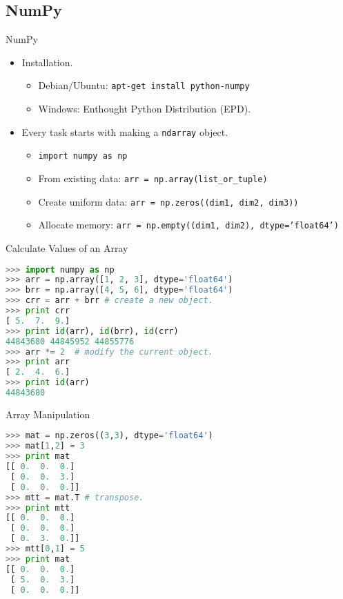 \documentclass[dvips,xcolor=pst]{beamer}
\begin{document}
\subsection{
NumPy
}

\begin{frame}{
%
NumPy
%
}
\begin{itemize} \large
  \item Installation.
  \begin{itemize} \large
    \item Debian/Ubuntu: \texttt{apt-get install python-numpy}
    \item Windows: Enthought Python Distribution (EPD).
  \end{itemize}
  \item Every task starts with making a \texttt{ndarray} object.
  \begin{itemize} \large
    \item \texttt{import numpy as np}
    \item From existing data: \texttt{arr = np.array(list\_or\_tuple)}
    \item Create uniform data: \texttt{arr = np.zeros((dim1, dim2, dim3))}
    \item Allocate memory: \texttt{arr = np.empty((dim1, dim2), dtype='float64')}
  \end{itemize}
\end{itemize}
\end{frame}

\begin{frame}[fragile]{
%
Calculate Values of an Array
%
}
\begin{lstlisting}[language=Python]
>>> import numpy as np
>>> arr = np.array([1, 2, 3], dtype='float64')
>>> brr = np.array([4, 5, 6], dtype='float64')
>>> crr = arr + brr # create a new object.
>>> print crr
[ 5.  7.  9.]
>>> print id(arr), id(brr), id(crr)
44843680 44845952 44855776
>>> arr *= 2  # modify the current object.
>>> print arr
[ 2.  4.  6.]
>>> print id(arr)
44843680
\end{lstlisting}
\end{frame}

\begin{frame}[fragile]{
%
Array Manipulation
%
}
\begin{lstlisting}[language=Python]
>>> mat = np.zeros((3,3), dtype='float64')
>>> mat[1,2] = 3
>>> print mat
[[ 0.  0.  0.]
 [ 0.  0.  3.]
 [ 0.  0.  0.]]
>>> mtt = mat.T # transpose.
>>> print mtt
[[ 0.  0.  0.]
 [ 0.  0.  0.]
 [ 0.  3.  0.]]
>>> mtt[0,1] = 5
>>> print mat
[[ 0.  0.  0.]
 [ 5.  0.  3.]
 [ 0.  0.  0.]]
\end{lstlisting}
\end{frame}
\end{document}
